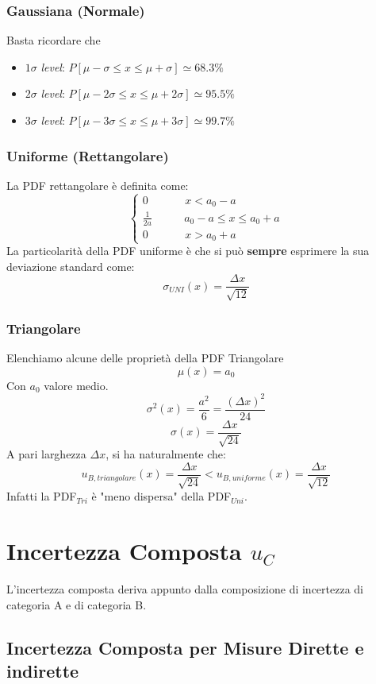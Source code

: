 \documentclass[a4paper,11pt]{report}
\begin{document}
\subsubsection{Gaussiana (Normale)}
Basta ricordare che
\begin{center}
\begin{itemize}
  \item $1\sigma$ \textit{level}: $P[\mu-\sigma \le x \le \mu+\sigma] \simeq 68.3\%$
  \item $2\sigma$ \textit{level}: $P[\mu-2\sigma \le x \le \mu+2\sigma] \simeq 95.5\%$
    \item $3\sigma$ \textit{level}: $P[\mu-3\sigma \le x \le \mu+3\sigma] \simeq 99.7\%$
\end{itemize}  
\end{center}
\subsubsection{Uniforme (Rettangolare)}
La PDF rettangolare è definita come:
\begin{equation}
   \begin{cases}
   0~~~~~~~~~~~~~~~x < a_0 -a\\
   \frac{1}{2a}~~~~~~~~~~~~~a_0 -a \le x \le a_0 + a\\
   0~~~~~~~~~~~~~~~x > a_0 +a
   \end{cases}
\end{equation}
La particolarità della PDF uniforme è che si può \textbf{sempre} esprimere la sua deviazione standard come:
$$
  \sigma_{UNI}(x) = \frac{\Delta x}{\sqrt{12}}
$$
\subsubsection{Triangolare}
Elenchiamo alcune delle proprietà della PDF Triangolare
$$
  \mu(x) = a_0
$$
Con $a_0$ valore medio.
$$
  \sigma^2(x) = \frac{a^2}{6} = \frac{(\Delta x)^2}{24}
$$
$$
  \sigma(x) = \frac{\Delta x}{\sqrt{24}}
$$
A pari larghezza $\Delta x$, si ha naturalmente che:
$$
  u_{B,triangolare}(x) = \frac{\Delta x}{\sqrt{24}} < u_{B,uniforme}(x) = \frac{\Delta x}{\sqrt{12}}
$$
Infatti la PDF$_{Tri}$ è "meno dispersa" della PDF$_{Uni}$.
\newpage
\section{Incertezza Composta $u_C$}
L'incertezza composta deriva appunto dalla composizione di incertezza di categoria A e di categoria B.
\subsection{Incertezza Composta per Misure Dirette e indirette}
\end{document}
